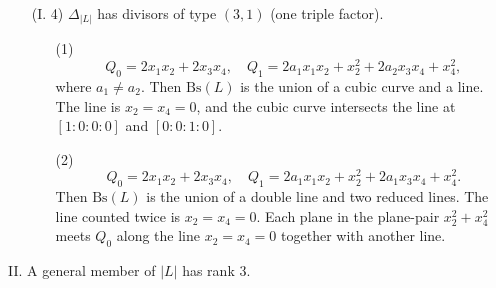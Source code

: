 \documentclass{amsart}[12pt]
\theoremstyle{definition}
\theoremstyle{remark}
\numberwithin{equation}{section}
\newcommand{\abs}[1]{\lvert#1\rvert}
\begin{document}
\begin{itemize}
\item[(I. 4)] $\Delta_{\abs{L}}$ has divisors of type $(3, 1)$ (one triple factor). 
\begin{enumerate}
\item[(1)] 
\[
Q_0 = 2x_1x_2 + 2x_3x_4, \quad Q_1 = 2a_1x_1x_2 + x_2^2 + 2a_2x_3x_4 + x_4^2,
\]
where $a_1 \neq a_2$. Then $\mathrm{Bs}(L)$ is the union of a cubic curve and a line. The line is $x_2 = x_4 = 0$, and the cubic curve intersects the line at $[1\colon 0 \colon 0 \colon 0]$ and $[0 \colon 0 \colon 1 \colon 0]$.
\item[(2)] 
\[
Q_0 = 2x_1x_2 + 2x_3x_4, \quad Q_1 = 2a_1x_1x_2 + x_2^2 + 2a_1x_3x_4 + x_4^2.
\]
Then $\mathrm{Bs}(L)$ is the union of a double line and two reduced lines. The line counted twice is $x_2 = x_4 = 0$. Each plane in the plane-pair $x_2^2 + x_4^2$ meets $Q_0$ along the line $x_2 = x_4 = 0$ together with another line. 
\end{enumerate}
\end{itemize}

II. A general member of $\abs{L}$ has rank 3.
\end{document}
